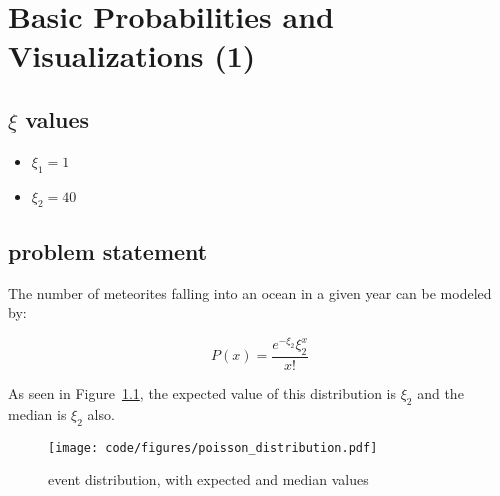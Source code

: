 \chapter{Basic Probabilities and Visualizations (1)}

\section*{$\xi$ values}

\begin{itemize}
    \item $\xi_1 = 1$
    \item $\xi_2 = 40$
\end{itemize}

\section{problem statement}

The number of meteorites falling into an ocean in a given year can be modeled by:

\begin{equation}
    P\left( x \right) = \frac{{e^{ - \xi_2 } \xi_2 ^x }}{{x!}}
\end{equation}

As seen in Figure~\ref{fig:poisson}, the expected value of this distribution is $\xi_2$ and the median is $\xi_2$ also.

\begin{figure}[h]
\centering
\texttt{[image: code/figures/poisson\_distribution.pdf]}
\caption{event distribution, with expected and median values\label{fig:poisson}}
\end{figure}
\FloatBarrier

